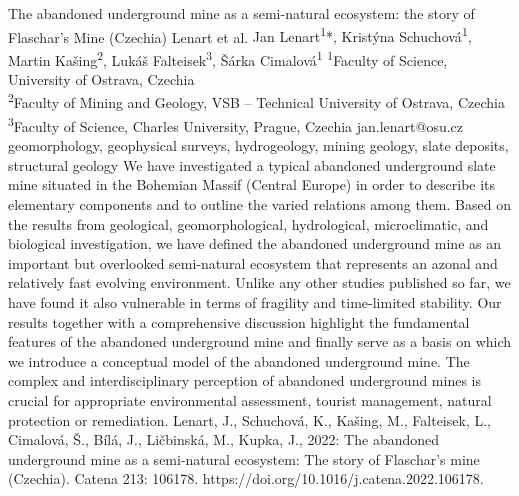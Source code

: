 \abstract
{The abandoned underground mine as a semi-natural ecosystem: the story of Flaschar's Mine (Czechia)} 
{Lenart et al.} 
{Jan Lenart\textsuperscript{1}*, Kristýna Schuchová\textsuperscript{1}, Martin Kašing\textsuperscript{2}, Lukáš Falteisek\textsuperscript{3}, Šárka Cimalová\textsuperscript{1}} 
{\TLtag} 
{
\textsuperscript{1}Faculty of Science, University of Ostrava, Czechia\\
\textsuperscript{2}Faculty of Mining and Geology, VSB – Technical University of Ostrava, Czechia\\
\textsuperscript{3}Faculty of Science, Charles University, Prague, Czechia
}
{jan.lenart@osu.cz}  %
{geomorphology, geophysical surveys, hydrogeology, mining geology, slate deposits, structural geology}
{We have investigated a typical abandoned underground slate mine situated in the Bohemian Massif (Central Europe) in order to describe its elementary components and to outline the varied relations among them. Based on the results from geological, geomorphological, hydrological, microclimatic, and biological investigation, we have defined the abandoned underground mine as an important but overlooked semi-natural ecosystem that represents an azonal and relatively fast evolving environment. Unlike any other studies published so far, we have found it also vulnerable in terms of fragility and time-limited stability. Our results together with a comprehensive discussion highlight the fundamental features of the abandoned underground mine and finally serve as a basis on which we introduce a conceptual model of the abandoned underground mine. The complex and interdisciplinary perception of abandoned underground mines is crucial for appropriate environmental assessment, tourist management, natural protection or remediation.
}
{Lenart, J., Schuchová, K., Kašing, M., Falteisek, L., Cimalová, Š., Bílá, J., Ličbinská, M., Kupka, J., 2022: The abandoned underground mine as a semi-natural ecosystem: The story of Flaschar's mine (Czechia). Catena 213: 106178. https://doi.org/10.1016/j.catena.2022.106178.
}

